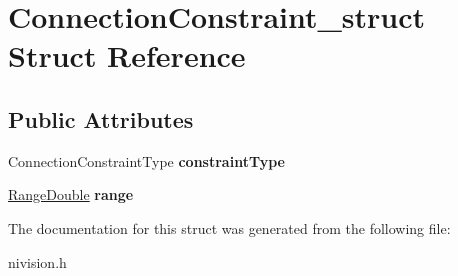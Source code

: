 \hypertarget{structConnectionConstraint__struct}{
\section{ConnectionConstraint\_\-struct Struct Reference}
\label{structConnectionConstraint__struct}
}
\subsection*{Public Attributes}
\begin{DoxyCompactItemize}
\item 
\hypertarget{structConnectionConstraint__struct_ae274daeeccf74bd985220b4d0ea85e97}{
ConnectionConstraintType {\bfseries constraintType}}
\label{structConnectionConstraint__struct_ae274daeeccf74bd985220b4d0ea85e97}

\item 
\hypertarget{structConnectionConstraint__struct_a0073b92ae9913d695b772824f8237a97}{
\hyperlink{structRangeDouble__struct}{RangeDouble} {\bfseries range}}
\label{structConnectionConstraint__struct_a0073b92ae9913d695b772824f8237a97}

\end{DoxyCompactItemize}


The documentation for this struct was generated from the following file:\begin{DoxyCompactItemize}
\item 
nivision.h\end{DoxyCompactItemize}
